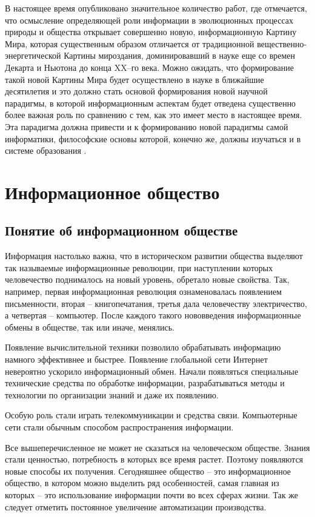 В настоящее время опубликовано значительное количество работ, где отмечается, что осмысление определяющей роли информации в эволюционных процессах природы и общества открывает совершенно новую, информационную Картину Мира, которая существенным образом отличается от традиционной вещественно-энергетической Картины мироздания, доминировавший в науке еще со времен Декарта и Ньютона до конца XX–го века. Можно ожидать, что формирование такой новой Картины Мира будет осуществлено в науке в ближайшие  десятилетия и это должно стать основой формирования новой научной парадигмы, в которой информационным аспектам будет отведена существенно более важная роль по сравнению с тем, как это имеет место в настоящее время. Эта парадигма должна привести и к формированию новой парадигмы самой информатики, философские основы которой, конечно же, должны изучаться и в системе образования \cite{bib304}.



\section{Информационное общество} \label{sect2_3}

\subsection{Понятие об информационном обществе} \label{subsect2_3_1}

Информация настолько важна, что в историческом развитии общества выделяют так называемые информационные революции, при наступлении которых человечество поднималось на новый уровень, обретало новые свойства. Так, например, первая информационная революция ознаменовалась появлением письменности, вторая – книгопечатания, третья дала человечеству электричество, а четвертая – компьютер. После каждого такого нововведения информационные обмены в обществе, так или иначе, менялись.

Появление вычислительной техники позволило обрабатывать информацию намного эффективнее и быстрее. Появление глобальной сети Интернет невероятно ускорило информационный обмен.
Начали появляться специальные технические средства по обработке информации, разрабатываться методы и технологии по организации знаний и даже их появлению.

Особую роль стали играть телекоммуникации и средства связи. Компьютерные сети стали обычным способом распространения информации.

Все вышеперечисленное не может не сказаться на человеческом обществе. Знания стали ценностью, потребность в которых все время растет. Поэтому появляются новые способы их получения.
Сегодняшнее общество – это информационное общество, в котором можно выделить ряд особенностей, самая главная из которых – это использование информации почти во всех сферах жизни. Так же следует отметить постоянное увеличение автоматизации производства.

